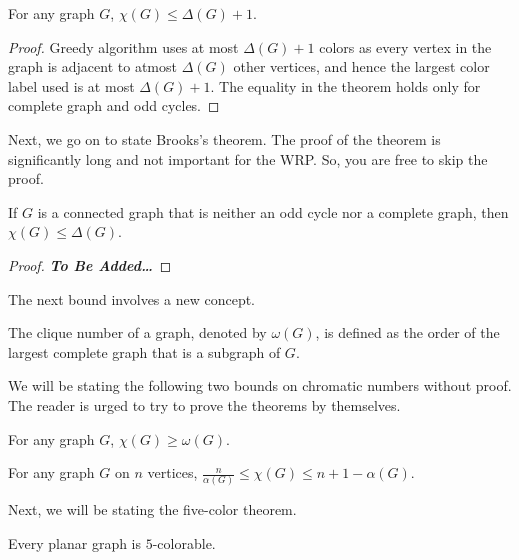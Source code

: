 \documentclass[../basic_graph_theory.tex]{subfiles}
\begin{document}
\begin{thm}
    For any graph $G$, $\chi(G) \le \Delta(G)+1$.
\end{thm}
\begin{proof}
    Greedy algorithm uses at most $\Delta(G)+1$ colors as every vertex in the graph is adjacent to atmost $\Delta(G)$ other vertices, and hence the largest color label used is at most $\Delta(G)+1$. The equality in the theorem holds only for complete graph and odd cycles.
\end{proof}
Next, we go on to state Brooks's theorem. The proof of the theorem is significantly long and not important for the WRP. So, you are free to skip the proof.\\
\begin{thm}
    If $G$ is a connected graph that is neither an odd cycle nor a complete graph, then $\chi(G) \le \Delta(G)$.
\end{thm}
\begin{proof}
    \textbf{\textit{To Be Added\dots}}
\end{proof}
The next bound involves a new concept.\\
\begin{defn}
    The clique number of a graph, denoted by $\omega(G)$, is defined as the order of the largest complete graph that is a subgraph of $G$.
\end{defn}
We will be stating the following two bounds on chromatic numbers without proof. The reader is urged to try to prove the theorems by themselves.\\
\begin{thm}
    For any graph $G$, $\chi(G) \ge \omega(G)$.
\end{thm}
\begin{thm}
    For any graph $G$ on $n$ vertices, $\frac{n}{\alpha(G)} \le \chi(G) \le n+1-\alpha(G)$.
\end{thm}
Next, we will be stating the five-color theorem.\\
\begin{thm}
    Every planar graph is $5$-colorable.
\end{thm}
\end{document}
